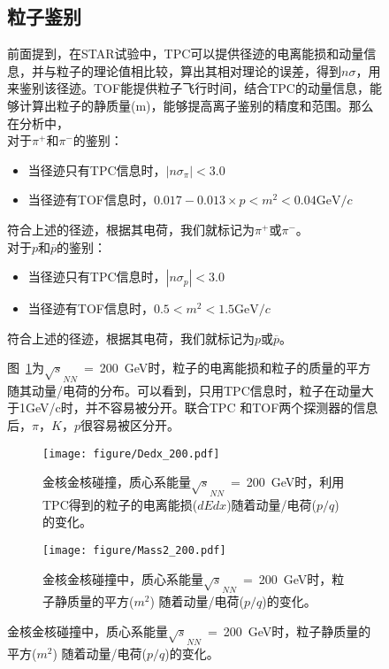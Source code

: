 \begin{figure}[htbp]
\subsection{粒子鉴别}
前面提到，在STAR试验中，TPC可以提供径迹的电离能损和动量信息，并与粒子的理论值相比较，算出其相对理论的误差，得到$n\sigma$，用来鉴别该径迹。TOF能提供粒子飞行时间，结合TPC的动量信息，能够计算出粒子的静质量(m)，能够提高离子鉴别的精度和范围。那么在分析中，\\对于$\pi^{+}$和$\pi^{-}$的鉴别：
\begin{itemize}
\item 当径迹只有TPC信息时，$|n\sigma_{\pi}| < 3.0 $
\item 当径迹有TOF信息时，$0.017-0.013 \times p < m^{2} <0.04 \mathrm{GeV}/\mathit{c} $
\end{itemize}
符合上述的径迹，根据其电荷，我们就标记为$\pi^{+}$或$\pi^{-}$。
\\对于$p$和$\overline{p}$的鉴别：
\begin{itemize}
\item 当径迹只有TPC信息时，$|n\sigma_{p}| < 3.0$
\item 当径迹有TOF信息时，$0.5 < m^{2} < 1.5 \mathrm{GeV}/\mathit{c}$
\end{itemize}

符合上述的径迹，根据其电荷，我们就标记为$p$或$\overline{p}$。

图~\ref{fig:Dedx_200}为$\sqrt{s}_{NN}$~=~200~GeV时，粒子的电离能损和粒子的质量的平方随其动量/电荷的分布。可以看到，只用TPC信息时，粒子在动量大于1GeV/c时，并不容易被分开。联合TPC 和TOF两个探测器的信息后，$\pi$，$K$，$p$很容易被区分开。

\begin{figure}[htbp]
\centering
\texttt{[image: figure/Dedx\_200.pdf]}
\caption{金核金核碰撞，质心系能量$\sqrt{s}_{NN}$~=~200~GeV时，利用TPC得到的粒子的电离能损($dEdx$)随着动量/电荷($p/q$)的变化。}
\label{fig:Dedx_200}
\end{figure}

\begin{figure}[htbp]
\centering
\texttt{[image: figure/Mass2\_200.pdf]}
\caption{金核金核碰撞中，质心系能量$\sqrt{s}_{NN}$~=~200~GeV时，粒子静质量的平方($m^{2}$) 随着动量/电荷($p/q$)的变化。}
\label{fig:Mass2_200}
\end{figure}

\vspace{0.2in}

\bigskip


\vspace{0.2in}





\end{figure}
